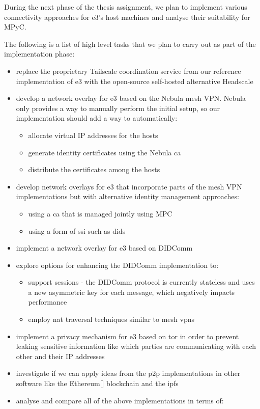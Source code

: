 During the next phase of the thesis assignment, we plan to implement
various connectivity approaches for \gls{e3}'s host machines and analyse
their suitability for MPyC.

The following is a list of high level tasks that we plan to carry out as
part of the implementation phase:

\begin{itemize}
\item
  replace the proprietary Tailscale coordination service from our
  reference implementation of \gls{e3} with the open-source self-hosted
  alternative Headscale\autocite{fontJuanfontHeadscale2022}
\item
  develop a network overlay for \gls{e3} based on the Nebula mesh VPN.
  Nebula only provides a way to manually perform the initial setup, so
  our implementation should add a way to automatically:

  \begin{itemize}
  \tightlist
  \item
    allocate virtual IP addresses for the hosts
  \item
    generate identity certificates using the Nebula \gls{ca}
  \item
    distribute the certificates among the hosts
  \end{itemize}
\item
  develop network overlays for \gls{e3} that incorporate parts of the
  mesh VPN implementations but with alternative identity management
  approaches:

  \begin{itemize}
  \tightlist
  \item
    using a \gls{ca} that is managed jointly using MPC
  \item
    using a form of \gls{ssi} such as \glspl{did}
  \end{itemize}
\item
  implement a network overlay for \gls{e3} based on DIDComm
\item
  explore options for enhancing the DIDComm implementation to:

  \begin{itemize}
  \tightlist
  \item
    support sessions - the DIDComm protocol is currently stateless and
    uses a new asymmetric key for each message, which negatively impacts
    performance
  \item
    employ \gls{nat} traversal techniques similar to mesh \glspl{vpn}
  \end{itemize}
\item
  implement a privacy mechanism for \gls{e3} based on \gls{tor} in order
  to prevent leaking sensitive information like which parties are
  communicating with each other and their IP addresses
\item
  investigate if we can apply ideas from the \gls{p2p} implementations
  in other software like the
  Ethereum{[}\textcite{ethereumDocs}{]}\autocite{ethereumYellowPaper}
  blockchain and the \gls{ipfs} \autocite{ipfsDocs}
\item
  analyse and compare all of the above implementations in terms of:


\end{itemize}
